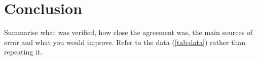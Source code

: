 \section{Conclusion}

Summarise what was verified, how close the agreement was, the main sources of error and what you would
improve. Refer to the data (\cref{tab:data}) rather than repeating it.
